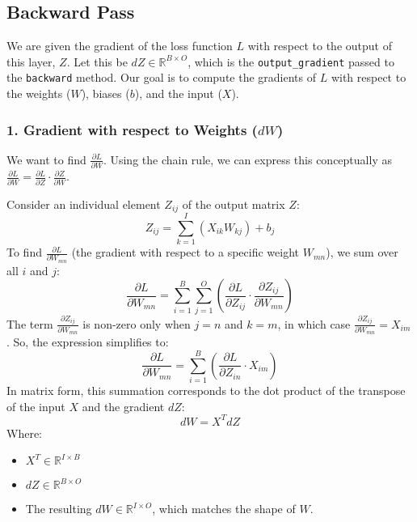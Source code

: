 \documentclass{article}
\begin{document}
\subsection*{Backward Pass}
We are given the gradient of the loss function $L$ with respect to the output of this layer, $Z$. Let this be $dZ \in \mathbb{R}^{B \times O}$, which is the \texttt{output_gradient} passed to the \texttt{backward} method. Our goal is to compute the gradients of $L$ with respect to the weights ($W$), biases ($b$), and the input ($X$).

\subsubsection*{1. Gradient with respect to Weights ($dW$)}
We want to find $\frac{\partial L}{\partial W}$. Using the chain rule, we can express this conceptually as $\frac{\partial L}{\partial W} = \frac{\partial L}{\partial Z} \cdot \frac{\partial Z}{\partial W}$.

Consider an individual element $Z_{ij}$ of the output matrix $Z$:
$$ Z_{ij} = \sum_{k=1}^{I} (X_{ik} W_{kj}) + b_j $$
To find $\frac{\partial L}{\partial W_{mn}}$ (the gradient with respect to a specific weight $W_{mn}$), we sum over all $i$ and $j$:
$$ \frac{\partial L}{\partial W_{mn}} = \sum_{i=1}^{B} \sum_{j=1}^{O} \left( \frac{\partial L}{\partial Z_{ij}} \cdot \frac{\partial Z_{ij}}{\partial W_{mn}} \right) $$
The term $\frac{\partial Z_{ij}}{\partial W_{mn}}$ is non-zero only when $j = n$ and $k = m$, in which case $\frac{\partial Z_{ij}}{\partial W_{mn}} = X_{im}$.
So, the expression simplifies to:
$$ \frac{\partial L}{\partial W_{mn}} = \sum_{i=1}^{B} \left( \frac{\partial L}{\partial Z_{in}} \cdot X_{im} \right) $$
In matrix form, this summation corresponds to the dot product of the transpose of the input $X$ and the gradient $dZ$:
$$ dW = X^T dZ $$
Where:
\begin{itemize}
    \item $X^T \in \mathbb{R}^{I \times B}$
    \item $dZ \in \mathbb{R}^{B \times O}$
    \item The resulting $dW \in \mathbb{R}^{I \times O}$, which matches the shape of $W$.
\end{itemize}
\end{document}
